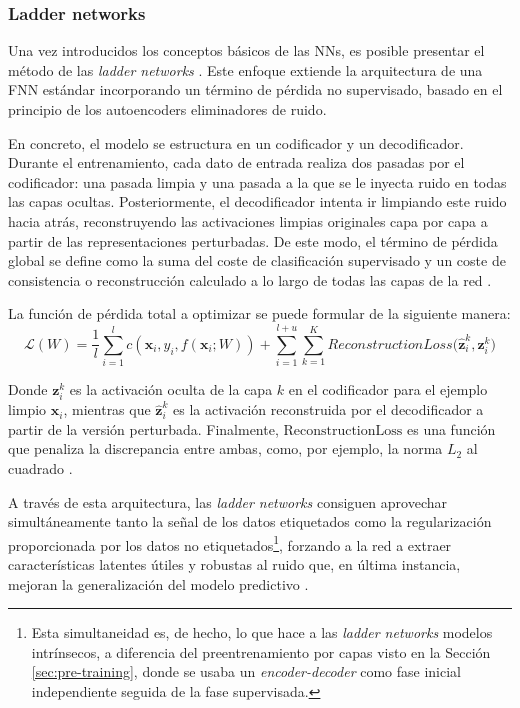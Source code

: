 \subsubsection{Ladder networks}

Una vez introducidos los conceptos básicos de las \glspl{NN}, es posible presentar el método de las \textit{ladder networks} \cite{rasmus2015semi}. Este enfoque extiende la arquitectura de una \gls{FNN} estándar incorporando un término de pérdida no supervisado, basado en el principio de los autoencoders eliminadores de ruido.

En concreto, el modelo se estructura en un codificador y un decodificador. Durante el entrenamiento, cada dato de entrada realiza dos pasadas por el codificador: una pasada limpia y una pasada a la que se le inyecta ruido en todas las capas ocultas. Posteriormente, el decodificador intenta ir limpiando este ruido hacia atrás, reconstruyendo las activaciones limpias originales capa por capa a partir de las representaciones perturbadas. De este modo, el término de pérdida global se define como la suma del coste de clasificación supervisado y un coste de consistencia o reconstrucción calculado a lo largo de todas las capas de la red \cite{rasmus2015semi}.

La función de pérdida total a optimizar se puede formular de la siguiente manera:
\begin{equation}
    \mathcal{L}(W) = \frac{1}{l} \sum_{i=1}^l c(\mathbf{x}_i,y_i,f(\mathbf{x}_i;W)) + \sum_{i=1}^{l+u} \sum_{k=1}^K ReconstructionLoss\bigl(\hat{\mathbf{z}}_i^k, \mathbf{z}_i^k\bigr)
\end{equation}

Donde $\mathbf{z}_i^k$ es la activación oculta de la capa $k$ en el codificador para el ejemplo limpio $\mathbf{x}_i$, mientras que $\hat{\mathbf{z}}_i^k$ es la activación reconstruida por el decodificador a partir de la versión perturbada. Finalmente, $\text{ReconstructionLoss}$ es una función que penaliza la discrepancia entre ambas, como, por ejemplo, la norma $L_2$ al cuadrado \cite{rasmus2015semi}.

A través de esta arquitectura, las \textit{ladder networks} consiguen aprovechar simultáneamente tanto la señal de los datos etiquetados como la regularización proporcionada por los datos no etiquetados\footnote{Esta simultaneidad es, de hecho, lo que hace a las \textit{ladder networks} modelos intrínsecos, a diferencia del preentrenamiento por capas visto en la Sección \ref{sec:pre-training}, donde se usaba un \textit{encoder-decoder} como fase inicial independiente seguida de la fase supervisada.}, forzando a la red a extraer características latentes útiles y robustas al ruido que, en última instancia, mejoran la generalización del modelo predictivo \cite{rasmus2015semi}.

